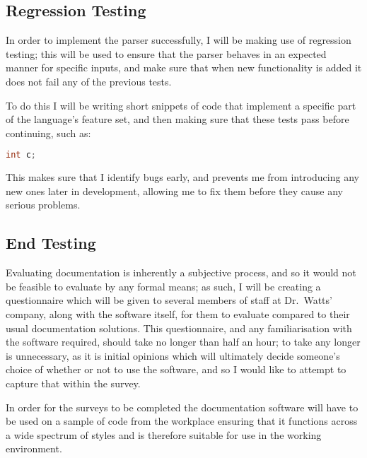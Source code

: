   \subsection{Regression Testing}
    In order to implement the parser successfully, I will be making use of
    regression testing; this will be used to ensure that the parser behaves
    in an expected manner for specific inputs, and make sure that when new
    functionality is added it does not fail any of the previous tests.

    To do this I will be writing short snippets of code that implement a
    specific part of the language's feature set, and then making sure that these
    tests pass before continuing, such as:

    \begin{lstlisting}[language=c, gobble=4]
      int c;
    \end{lstlisting}

    This makes sure that I identify bugs early, and prevents me from introducing
    any new ones later in development, allowing me to fix them before they cause
    any serious problems.

  \subsection{End Testing}
    Evaluating documentation is inherently a subjective process, and so it would
    not be feasible to evaluate by any formal means; as such, I will be creating
    a questionnaire which will be given to several members of staff at
    Dr.~Watts' company, along with the software itself, for them to evaluate
    compared to their usual documentation solutions. This questionnaire, and any
    familiarisation with the software required, should take no longer than half
    an hour; to take any longer is unnecessary, as it is initial opinions which
    will ultimately decide someone's choice of whether or not to use the
    software, and so I would like to attempt to capture that within the survey.

    In order for the surveys to be completed the documentation software will
    have to be used on a sample of code from the workplace ensuring that it
    functions across a wide spectrum of styles and is therefore suitable for use
    in the working environment.

